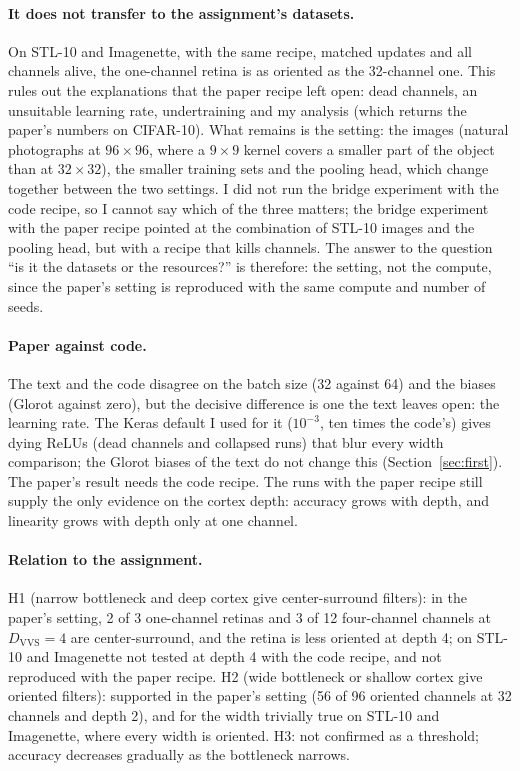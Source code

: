 \documentclass[11pt,a4paper]{article}
\newcommand{\DVVS}{D_{\mathrm{VVS}}}
\begin{document}
\paragraph{It does not transfer to the assignment's datasets.} On STL-10 and Imagenette, with the same recipe, matched updates and all channels alive, the one-channel retina is as oriented as the 32-channel one. This rules out the explanations that the paper recipe left open: dead channels, an unsuitable learning rate, undertraining and my analysis (which returns the paper's numbers on CIFAR-10). What remains is the setting: the images (natural photographs at $96{\times}96$, where a $9{\times}9$ kernel covers a smaller part of the object than at $32{\times}32$), the smaller training sets and the pooling head, which change together between the two settings. I did not run the bridge experiment with the code recipe, so I cannot say which of the three matters; the bridge experiment with the paper recipe pointed at the combination of STL-10 images and the pooling head, but with a recipe that kills channels. The answer to the question ``is it the datasets or the resources?'' is therefore: the setting, not the compute, since the paper's setting is reproduced with the same compute and number of seeds.

\paragraph{Paper against code.} The text and the code disagree on the batch size (32 against 64) and the biases (Glorot against zero), but the decisive difference is one the text leaves open: the learning rate. The Keras default I used for it ($10^{-3}$, ten times the code's) gives dying ReLUs (dead channels and collapsed runs) that blur every width comparison; the Glorot biases of the text do not change this (Section~\ref{sec:first}). The paper's result needs the code recipe. The runs with the paper recipe still supply the only evidence on the cortex depth: accuracy grows with depth, and linearity grows with depth only at one channel.

\paragraph{Relation to the assignment.} H1 (narrow bottleneck and deep cortex give center-surround filters): in the paper's setting, 2 of 3 one-channel retinas and 3 of 12 four-channel channels at $\DVVS=4$ are center-surround, and the retina is less oriented at depth 4; on STL-10 and Imagenette not tested at depth 4 with the code recipe, and not reproduced with the paper recipe. H2 (wide bottleneck or shallow cortex give oriented filters): supported in the paper's setting (56 of 96 oriented channels at 32 channels and depth 2), and for the width trivially true on STL-10 and Imagenette, where every width is oriented. H3: not confirmed as a threshold; accuracy decreases gradually as the bottleneck narrows.
\end{document}
